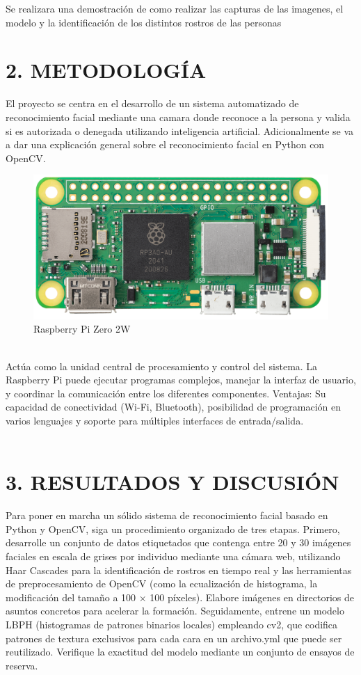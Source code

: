 \documentclass[esp]{ECCI-SIME-class}
\begin{document}
Se realizara una demostración de como realizar las capturas de las imagenes, el modelo y la identificación de los distintos rostros de las personas

\section{2.	METODOLOGÍA}
El proyecto se centra en el desarrollo de un sistema automatizado de reconocimiento facial mediante una camara donde reconoce a la persona y valida si es autorizada o denegada utilizando inteligencia artificial. Adicionalmente se va a dar una explicación general sobre el reconocimiento facial en Python con OpenCV.
 \\

\begin{figure}[!h] 
     \centering
     \includegraphics[width=.8\columnwidth]{Plantilla IEEE ECCI/Imagenes/zero2-close-up.png} 
     \caption{Raspberry Pi Zero 2W} \label{fig-1}
\end{figure} 

\\Actúa como la unidad central de procesamiento y control del sistema. La Raspberry Pi puede ejecutar programas complejos, manejar la interfaz de usuario, y coordinar la comunicación entre los diferentes componentes.
Ventajas: Su capacidad de conectividad (Wi-Fi, Bluetooth), posibilidad de programación en varios lenguajes y soporte para múltiples interfaces de entrada/salida. \\ \\


\section{3.	RESULTADOS Y DISCUSIÓN}

Para poner en marcha un sólido sistema de reconocimiento facial basado en Python y OpenCV, siga un procedimiento organizado de tres etapas. Primero, desarrolle un conjunto de datos etiquetados que contenga entre 20 y 30 imágenes faciales en escala de grises por individuo mediante una cámara web, utilizando Haar Cascades para la identificación de rostros en tiempo real y las herramientas de preprocesamiento de OpenCV (como la ecualización de histograma, la modificación del tamaño a 100 × 100 píxeles). Elabore imágenes en directorios de asuntos concretos para acelerar la formación. Seguidamente, entrene un modelo LBPH (histogramas de patrones binarios locales) empleando cv2, que codifica patrones de textura exclusivos para cada cara en un archivo.yml que puede ser reutilizado. Verifique la exactitud del modelo mediante un conjunto de ensayos de reserva.
\end{document}
